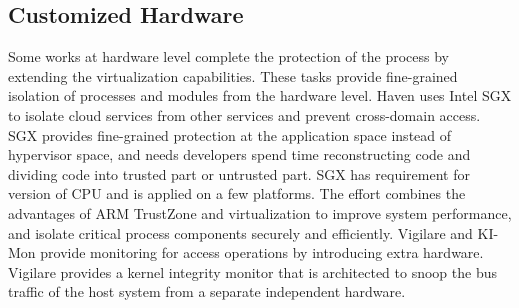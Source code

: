 \documentclass[conference]{IEEEtran}
\begin{document}

\subsection{Customized Hardware }
Some works at hardware level complete the protection of the process by extending the virtualization capabilities. These tasks provide fine-grained isolation of processes and modules from the hardware level. Haven \cite{haven} uses Intel SGX\cite{Hoekstra13cuvillo,Mckeen2013Innovative} to isolate cloud services from other services and prevent cross-domain access. SGX provides fine-grained protection at the application space instead of hypervisor space, and needs developers spend time reconstructing code and dividing code into trusted part or untrusted part. SGX has requirement for version of CPU and is applied on a few platforms. The effort \cite{Cho2016Hardware} combines the advantages of ARM TrustZone and virtualization to improve system performance, and isolate critical process components securely and efficiently.
 Vigilare\cite{Moon2012Vigilare} and KI-Mon \cite{Lee2013KI} provide monitoring for access operations by introducing extra hardware. Vigilare provides a kernel integrity monitor that is architected to snoop the bus traffic of the host system from a separate independent hardware. 
\end{document}
